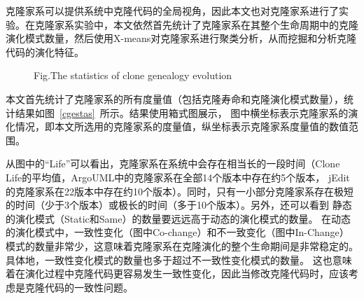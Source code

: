 克隆家系可以提供系统中克隆代码的全局视角，因此本文也对克隆家系进行了实验。在克隆家系实验中，本文依然首先统计了克隆家系在其整个生命周期中的克隆演化模式数量，然后使用X-means对克隆家系进行聚类分析，从而挖掘和分析克隆代码的演化特征。
 
\begin{figure}[htbp]
\centering
\subfigure{\label{cgestargo}}
\addtocounter{subfigure}{-2}
\subfigure{\label{cgestjedit}}
\addtocounter{subfigure}{-2}
{Fig.$\!$}{The statistics of clone genealogy evolution}
\vspace{-1em}
\end{figure}

本文首先统计了克隆家系的所有度量值（包括克隆寿命和克隆演化模式数量），统计结果如图~\ref{cgestas}~所示。结果使用箱式图展示， 图中横坐标表示克隆家系的演化情况，即本文所选用的克隆家系的度量值，纵坐标表示克隆家系度量值的数值范围。
 
从图中的“Life”可以看出，克隆家系在系统中会存在相当长的一段时间（Clone Life的平均值，ArgoUML中的克隆家系在全部14个版本中存在约5个版本， jEdit的克隆家系在22版本中存在约10个版本）。同时，只有一小部分克隆家系存在极短的时间（少于3个版本）或极长的时间（多于10个版本）。另外，还可以看到 静态的演化模式（Static和Same）的数量要远远高于动态的演化模式的数量。 在动态的演化模式中，一致性变化（图中Co-change）和不一致变化（图中In-Change）模式的数量非常少，这意味着克隆家系在克隆演化的整个生命期间是非常稳定的。具体地，一致性变化模式的数量也多于超过不一致性变化模式的数量。 这也意味着在演化过程中克隆代码更容易发生一致性变化，因此当修改克隆代码时，应该考虑是克隆代码的一致性问题。
 
